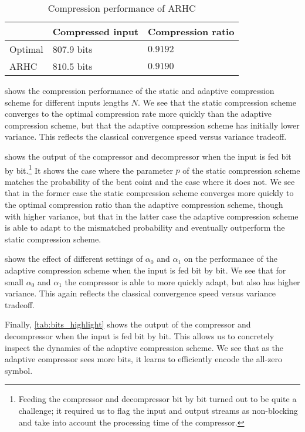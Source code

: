 \documentclass[letterpaper,11pt]{extarticle}
\begin{document}
\begin{table}[ht]
    \centering
    \begin{tabular}{l|ll}
        \toprule
        & Compressed input & Compression ratio \\ \midrule
        Optimal & $807.9$ bits & $0.9192$ \\
        ARHC & $810.5$ bits & $0.9190$ \\ \bottomrule
    \end{tabular}
    \caption{Compression performance of ARHC}
    \label{tab:compression_performance}
\end{table}

 shows the compression performance of the static and adaptive compression scheme for different inputs lengths $N$. We see that the static compression scheme converges to the optimal compression rate more quickly than the adaptive compression scheme, but that the adaptive compression scheme has initially lower variance. This reflects the classical convergence speed versus variance tradeoff.

 shows the output of the compressor and decompressor when the input is fed bit by bit.\footnote{Feeding the compressor and decompressor bit by bit turned out to be quite a challenge; it required us to flag the input and output streams as non-blocking and take into account the processing time of the compressor.} It shows the case where the parameter $p$ of the static compression scheme matches the probability of the bent coint and the case where it does not. We see that in the former case the static compression scheme converges more quickly to the optimal compression ratio than the adaptive compression scheme, though with higher variance, but that in the latter case the adaptive compression scheme is able to adapt to the mismatched probability and eventually outperform the static compression scheme.

 shows the effect of different settings of $\alpha_0$ and $\alpha_1$ on the performance of the adaptive compression scheme when the input is fed bit by bit. We see that for small $\alpha_0$ and $\alpha_1$ the compressor is able to more quickly adapt, but also has higher variance. This again reflects the classical convergence speed versus variance tradeoff.

Finally, \cref{tab:bits_highlight} shows the output of the compressor and decompressor when the input is fed bit by bit. This allows us to concretely inspect the dynamics of the adaptive compression scheme. We see that as the adaptive compressor sees more bits, it learns to efficiently encode the all-zero symbol.
\end{document}
